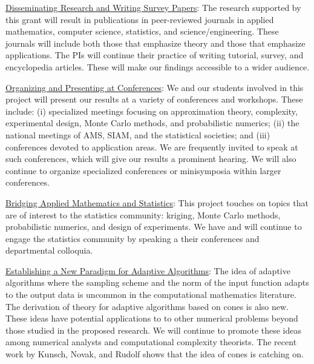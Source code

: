 \documentclass[11pt]{NSFamsart}
\newcommand{\Upara}[1]{\noindent\underline{\upshape #1}:}
\begin{document}
\Upara{Disseminating Research and Writing Survey Papers}
The research supported by this grant will result in publications in peer-reviewed journals in applied mathematics, computer science, statistics, and science/engineering. These 
journals will include both those that emphasize theory and those that emphasize applications.  The PIs will continue their practice of writing tutorial, survey, and encyclopedia articles.  These will make our findings accessible to a wider audience.


\Upara{Organizing and Presenting at Conferences}
We and our students involved in this project will present our results at a variety of conferences and workshops.  These include: (i) specialized meetings focusing on approximation theory, complexity, 
experimental design, Monte Carlo methods, and probabilistic numerics; (ii) the national meetings of AMS, SIAM, and the 
statistical societies; and (iii) conferences devoted to application areas.  We are frequently invited to 
speak at such conferences, which will give our results a prominent hearing. We will also continue to 
organize specialized conferences or minisymposia within larger conferences.

\Upara{Bridging Applied Mathematics and Statistics}
This project touches on topics that are of interest to the statistics community: kriging, Monte Carlo methods, probabilistic numerics, and design of experiments.  We have and will continue to engage the statistics community 
by speaking a their conferences and departmental colloquia.

\Upara{Establishing a New Paradigm for Adaptive Algorithms} 
The idea of adaptive algorithms where the sampling scheme and the norm of the input function adapts to the output data is uncommon in the computational mathematics literature.  The derivation of theory for adaptive algorithms based on cones is also new.  These ideas have potential applications to to other numerical problems beyond those studied in the proposed research.  We will continue to promote these ideas among numerical analysts and computational complexity theorists.  The recent work by Kunsch, Novak, and Rudolf \cite{KunEtal19a} shows that the idea of cones is catching on.
\end{document}
